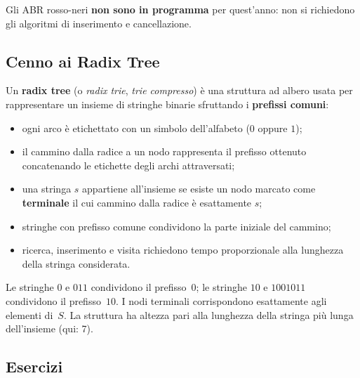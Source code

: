 \begin{hardnote}
	Gli ABR rosso-neri \textbf{non sono in programma} per quest'anno:
	non si richiedono gli algoritmi di inserimento e cancellazione.
\end{hardnote}

\subsection{Cenno ai Radix Tree}
\label{sub:radix}

\begin{definizione}
	Un \textbf{radix tree} (o \emph{radix trie}, \emph{trie compresso}) è una struttura ad
	albero usata per rappresentare un insieme di stringhe binarie sfruttando i
	\textbf{prefissi comuni}:
	\begin{itemize}
		\item ogni arco è etichettato con un simbolo dell'alfabeto ($0$ oppure $1$);
		\item il cammino dalla radice a un nodo rappresenta il prefisso ottenuto
		concatenando le etichette degli archi attraversati;
		\item una stringa $s$ appartiene all'insieme se esiste un nodo marcato come
		\textbf{terminale} il cui cammino dalla radice è esattamente $s$;
		\item stringhe con prefisso comune condividono la parte iniziale del cammino;
		\item ricerca, inserimento e visita richiedono tempo proporzionale alla lunghezza
		della stringa considerata.
	\end{itemize}
\end{definizione}

\begin{esempio}[Radix tree per $S = \{0,\, 011,\, 10,\, 1001011\}$]
	Le stringhe $0$ e $011$ condividono il prefisso~$0$; le stringhe $10$ e $1001011$
	condividono il prefisso~$10$. I nodi terminali corrispondono esattamente agli elementi
	di~$S$. La struttura ha altezza pari alla lunghezza della stringa più lunga
	dell'insieme (qui: 7).
\end{esempio}

\subsection{Esercizi}
\label{sub:abr_esercizi}


